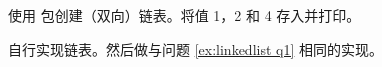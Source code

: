 \begin{Exercise}[title={链表},difficulty=1]
\label{ex:linkedlist}
\Question
\label{ex:linkedlist q1}
使用  包创建（双向）链表。将值 1，2 和 4 存入并打印。

\Question
自行实现链表。然后做与问题 \ref{ex:linkedlist q1} 相同的实现。
\end{Exercise}

\begin{Answer}
\Question

\Question
\end{Answer}
